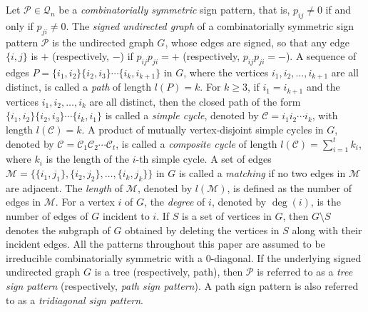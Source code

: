\documentclass[a4paper, 10pt]{article}
\numberwithin{equation}{section}
\begin{document}
	
	Let $\mathcal{P}\in \mathcal{Q}_n$ be a \textit{combinatorially symmetric} sign pattern, that is, $p_{ij}\neq 0$ if and only if $p_{ji}\neq 0$.
	The \textit{signed undirected graph} of a combinatorially symmetric sign pattern $\mathcal{P}$ is the undirected graph $G$, whose edges are signed, so that any edge $\{i,j\}$ is $+$ (respectively, $-$) if $p_{ij}p_{ji} = +$
	(respectively, $p_{ij}p_{ji}=-$). 
	A sequence of edges $P=\{i_1, i_2\} \{i_2, i_3\} \cdots \{i_k, i_{k+1}\}$ in $G$, where the vertices $i_1, i_2, \dots, i_{k+1}$ are all distinct, is called a \textit{path} of length $l(P)=k$.
	For $k \geq 3$, if $i_1 = i_{k+1}$ and the vertices $i_1, i_2, \dots, i_k$ are all distinct, then the closed path of the form $\{i_1, i_2\} \{i_2, i_3\} \cdots \{i_k, i_1\}$ is called a \textit{simple cycle}, denoted by $\mathcal{C} = i_1i_2\cdots i_k$, with length $l(\mathcal{C}) = k$.
	A product of mutually vertex-disjoint simple cycles in $G$, denoted by $\mathcal{C} = \mathcal{C}_1 \mathcal{C}_2 \cdots \mathcal{C}_t$, is called a \textit{composite cycle} of length $l(\mathcal{C})=\sum_{i=1}^{t} k_i$, where $k_i$ is the length of the $i$-th simple cycle. A set of edges $\mathcal{M} = \{\{i_1, j_1\}, \{i_2, j_2\}, \dots, \{i_k, j_k\}\}$ in $G$ is called a \textit{matching} if no two edges in $\mathcal{M}$ are adjacent. The \textit{length} of $\mathcal{M}$, denoted by $l(\mathcal{M})$, is defined as the number of edges in $\mathcal{M}$.
	For a vertex $i$ of $G$, the \textit{degree} of $i$, denoted by $\deg(i)$, is the number of edges of $G$ incident to $i$.
	If $S$ is a set of vertices in $G$, then $G \setminus S$ denotes the subgraph of $ G $ obtained by deleting the vertices in $S$ along with their incident edges.
	All the patterns throughout this paper are assumed to be irreducible combinatorially symmetric with a $0$-diagonal.
	If the underlying signed undirected graph $G$ is a tree (respectively, path), then $\mathcal{P}$ is referred to as a \textit{tree sign pattern} (respectively, \textit{path sign pattern}). A path sign pattern is also referred to as a \textit{tridiagonal sign pattern}.
	
	
\end{document}
